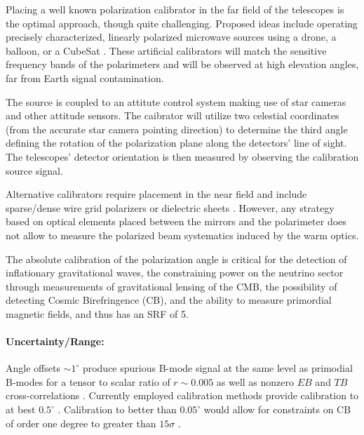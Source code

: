 Placing a well known polarization calibrator in the far field of the telescopes
is the optimal approach, though quite challenging. Proposed ideas include
operating precisely characterized, linearly polarized microwave sources using a
drone, a balloon, or a CubeSat \cite{nati_2017, Johnson2015}. These artificial
calibrators will match the sensitive frequency bands of the polarimeters and
will be observed at high elevation angles, far from Earth signal contamination.

The source is coupled to an attitute control system making use of star cameras
and other attitude sensors. The caibrator will utilize two celestial
coordinates (from the accurate star camera pointing direction) to determine the
third angle defining the rotation of the polarization plane along the
detectors' line of sight. The telescopes' detector orientation is then measured
by observing the calibration source signal. 


Alternative calibrators require placement in the near field and include
sparse/dense wire grid polarizers or dielectric sheets \cite{Takahashi2010,
2016arXiv160701825K}.  However, any strategy based on optical elements placed
between the mirrors and the polarimeter does not allow to measure the polarized
beam systematics induced by the warm optics. 


The absolute calibration of the polarization angle is critical for the
detection of inflationary gravitational waves, the constraining power on the
neutrino sector through measurements of gravitational lensing of the CMB, the
possibility of detecting Cosmic Birefringence (CB), and the ability to measure
primordial magnetic fields, and thus has an SRF of 5.

\paragraph{Uncertainty/Range:}

Angle offsets $\sim 1^{\circ}$ produce spurious B-mode signal at the same level
as primodial B-modes for a tensor to scalar ratio of $r \sim 0.005$ as well as
nonzero $EB$ and $TB$ cross-correlations \cite{doi:10.1142/S0218271816400125}.
Currently employed calibration methods provide calibration to at
best $0.5^{\circ}$ \cite{2016MNRAS.455.1981K}.
Calibration to better than $0.05^{\circ}$ would allow for constraints on CB of
order one degree to greater than $15\sigma$ \cite{2016MNRAS.455.1981K}.

